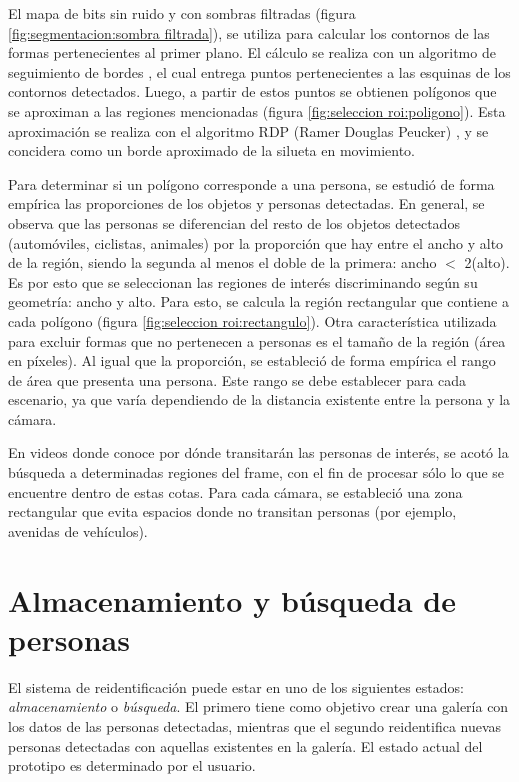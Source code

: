 \documentclass[../memoria.tex]{subfiles}
\begin{document}
El mapa de bits sin ruido y con sombras filtradas (figura \ref{fig:segmentacion:sombra filtrada}), se utiliza para calcular los contornos de las formas pertenecientes al primer plano. El cálculo se realiza con un algoritmo de seguimiento de bordes \cite{suzuki1985topological}, el cual entrega puntos pertenecientes a las esquinas de los contornos detectados. Luego, a partir de estos puntos se obtienen polígonos que se aproximan a las regiones mencionadas (figura \ref{fig:seleccion roi:poligono}). Esta aproximación se realiza con el algoritmo RDP (Ramer Douglas Peucker) \cite{douglas1973algorithms}, y se concidera como un borde aproximado de la silueta en movimiento.

Para determinar si un polígono corresponde a una persona, se estudió de forma empírica las proporciones de los objetos y personas detectadas. En general, se observa que las personas se diferencian del resto de los objetos detectados (automóviles, ciclistas, animales) por la proporción que hay entre el ancho y alto de la región, siendo la segunda al menos el doble de la primera: ancho $<$ 2(alto). Es por esto que se seleccionan las regiones de interés discriminando según su geometría: ancho y alto. Para esto, se calcula la región rectangular que contiene a cada polígono (figura \ref{fig:seleccion roi:rectangulo}). Otra característica utilizada para excluir formas que no pertenecen a personas es el tamaño de la región (área en píxeles). Al igual que la proporción, se estableció de forma empírica el rango de área que presenta una persona. Este rango se debe establecer para cada escenario, ya que varía dependiendo de la distancia existente entre la persona y la cámara. 

En videos donde conoce por dónde transitarán las personas de interés, se acotó la búsqueda a determinadas regiones del frame, con el fin de procesar sólo lo que se encuentre dentro de estas cotas. Para cada cámara, se estableció una zona rectangular que evita espacios donde no transitan personas (por ejemplo, avenidas de vehículos).

\section{Almacenamiento y búsqueda de personas}

El sistema de reidentificación puede estar en uno de los siguientes estados: \emph{almacenamiento} o \emph{búsqueda}. El primero tiene como objetivo crear una galería con los datos de las personas detectadas, mientras que el segundo reidentifica nuevas personas detectadas con aquellas existentes en la galería. El estado actual del prototipo es determinado por el usuario.
\end{document}
